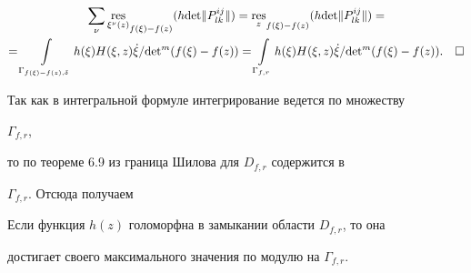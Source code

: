 \begin{multline*} 


\sum_\nu {\res_{\xi^\nu(z)}}_{f(\xi)-f(z)} 


(h\det\|P^{i j}_{l k}\|)={\res_z}_{f(\xi)-f(z)} 


(h\det\|P^{i j}_{l k}\|)= \\ 


% 


=\int\limits_{\Gamma_{f(\xi)-f(z),\delta}}h(\xi)H(\xi,z)\Dot\xi 


/\det{}^m(f(\xi)-f(z))=\int\limits_{\Gamma_{f,r}} 


h(\xi)H(\xi,z)\Dot\xi/\det{}^m(f(\xi)-f(z)). \quad\square 


\end{multline*} 


\medskip 


 


Так как в интегральной формуле интегрирование ведется по множеству 


$\Gamma_{f,r}$, 


то по теореме 6.9 из \cite{2} граница Шилова для $D_{f,r}$ содержится в 


$\Gamma_{f,r}$. Отсюда получаем 


 


\begin{cornonum} 


Если функция $h(z)$ голоморфна в замыкании области $D_{f,r}$, то она 


достигает своего максимального значения по модулю на $\Gamma_{f,r}$. 


\end{cornonum} 


 


 


 


